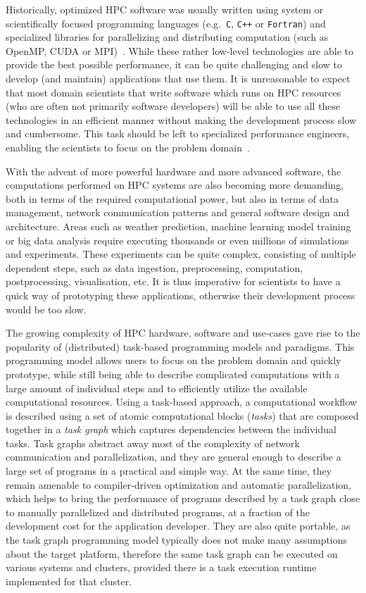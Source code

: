 Historically, optimized HPC software was usually written using system or scientifically focused
programming languages (e.g.~\texttt{C}, \texttt{C++} or
\texttt{Fortran}) and specialized libraries for parallelizing and distributing computation
(such as OpenMP, CUDA or MPI)~\cite{mpistudy}. While these rather low-level technologies are
able to provide the best possible performance, it can be quite challenging and slow to develop (and
maintain) applications that use them. It is unreasonable to expect that most domain scientists that
write software which runs on HPC resources (who are often not primarily software developers) will
be able to use all these technologies in an efficient manner without making the development process
slow and cumbersome. This task should be left to specialized performance engineers, enabling the
scientists to focus on the problem domain~\cite{dace}.

With the advent of more powerful hardware and more advanced software, the computations performed on
HPC systems are also becoming more demanding, both in terms of the required computational power,
but also in terms of data management, network communication patterns and general software design
and architecture. Areas such as weather prediction, machine learning model training or big data
analysis require executing thousands or even millions of simulations and experiments. These
experiments can be quite complex, consisting of multiple dependent steps, such as data ingestion,
preprocessing, computation, postprocessing, visualisation, etc. It is thus imperative for
scientists to have a quick way of prototyping these applications, otherwise their development
process would be too slow.

The growing complexity of HPC hardware, software and use-cases gave rise to the popularity of
(distributed) task-based programming models and paradigms. This programming model allows users to
focus on the problem domain and quickly prototype, while still being able to describe complicated
computations with a large amount of individual steps and to efficiently utilize the available
computational resources. Using a task-based approach, a computational workflow is described using a
set of atomic computational blocks (\emph{tasks}) that are composed together in a
\emph{task graph} which captures dependencies between the individual tasks. Task graphs
abstract away most of the complexity of network communication and parallelization, and they are
general enough to describe a large set of programs in a practical and simple way. At the same time,
they remain amenable to compiler-driven optimization and automatic parallelization, which helps to
bring the performance of programs described by a task graph close to manually parallelized and
distributed programs, at a fraction of the development cost for the application developer. They are
also quite portable, as the task graph programming model typically does not make many assumptions
about the target platform, therefore the same task graph can be executed on various systems and
clusters, provided there is a task execution runtime implemented for that cluster.

